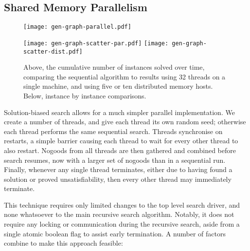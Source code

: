 \documentclass[runningheads]{llncs}
\begin{document}
\subsection{Shared Memory Parallelism}

\begin{figure}[tb]
    \texttt{[image: gen-graph-parallel.pdf]}

    \medskip

    \texttt{[image: gen-graph-scatter-par.pdf]}
    \hfill
    \texttt{[image: gen-graph-scatter-dist.pdf]}

    \caption{Above, the cumulative number of instances solved over time, comparing the sequential
    algorithm to results using 32 threads on a single machine, and using five or ten distributed
    memory hosts. Below, instance by instance comparisons.}\label{figure:parallel}
\end{figure}

Solution-biased search allows for a much simpler parallel implementation. We create a
number of threads, and give each thread its own random seed; otherwise each thread performs the same
sequential search. Threads synchronise on restarts, a simple barrier causing each thread to wait for
every other thread to also restart.  Nogoods from all threads are then gathered and combined before
search resumes, now with a larger set of nogoods than in a sequential run.  Finally, whenever any
single thread terminates, either due to having found a solution or proved unsatisfiability, then
every other thread may immediately terminate.

This technique requires only limited changes to the top level search driver, and none whatsoever to
the main recursive search algorithm. Notably, it does not require any locking or communication
during the recursive search, aside from a single atomic boolean flag to assist early termination.  A
number of factors combine to make this approach feasible:
\end{document}
